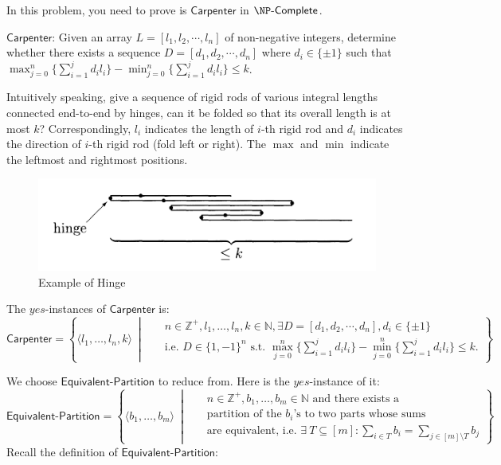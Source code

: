 
In this problem, you need to prove is $\mathsf{Carpenter}$ in $\complete{\NP}$.

$\mathsf{Carpenter}$: Given an array \(L=[l_1,l_2,\cdots,l_n]\) of non-negative integers, determine whether there exists a sequence $D=[d_1,d_2,\cdots,d_n]$ where $d_i\in\{\pm 1\}$ such that $\max_{j=0}^n\{\sum_{i=1}^{j}d_il_i\}-\min_{j=0}^n\{\sum_{i=1}^{j}d_il_i\}\leq k$.

Intuitively speaking, give a sequence of rigid rods of various integral lengths connected end-to-end by hinges, can it be folded so that its overall length is at most $k$? Correspondingly, $l_i$ indicates the length of $i$-th rigid rod and $d_i$ indicates the direction of $i$-th rigid rod (fold left or right). The $\max$ and $\min$ indicate the leftmost and rightmost positions.

\begin{figure}[H]
    \centering
    \includegraphics[width=0.5\linewidth]{hinge.png}
    \caption{Example of Hinge}
\end{figure}

The $yes$-instances of $\mathsf{Carpenter}$ is:
\begin{equation*}
\mathsf{Carpenter}= \left\{\langle{l_1, \ldots, l_{n},k\rangle}~\middle|~~~
\begin{aligned}
    & n\in \mathbb{Z}^+, l_1, \ldots, l_{n},k\in \mathbb{N},\exists D=[d_1,d_2,\cdots,d_n], d_i\in\{\pm 1\} \\ 
    & \text{i.e. }  D\in \{1,-1\}^{n} \text{ s.t. } \max_{j=0}^n\{\sum_{i=1}^{j}d_il_i\}-\min_{j=0}^n\{\sum_{i=1}^{j}d_il_i\}\leq k.
\end{aligned}
\right\}
\end{equation*}

\noindent We choose $\mathsf{Equivalent \text{-} Partition}$ to reduce from. Here is the $yes$-instance of it:
\begin{equation*}
\mathsf{Equivalent \text{-} Partition}= \left\{\langle{b_1, \ldots, b_{m}\rangle}~\middle|~~~\begin{aligned}
    &n\in \mathbb{Z}^+, b_1, \ldots, b_{m}\in \mathbb{N} \text{ and there exists a} \\ &\text{partition of the $b_i$'s to two parts whose sums}\\ &\text{are equivalent, i.e. }\exists{\:T\subseteq [m]}: \sum_{i\in T} b_i =  \sum_{j\in [m] \setminus T} b_j
\end{aligned}\right\}
\end{equation*}
Recall the definition of $\mathsf{Equivalent \text{-} Partition}$:

